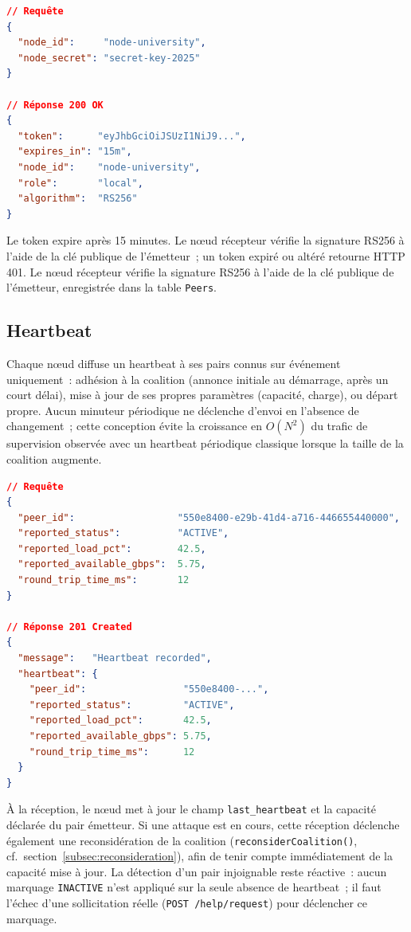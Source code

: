 \begin{lstlisting}[language=json, caption={Requête et réponse — \texttt{POST /auth/token}.}, label=lst:auth]
// Requête
{
  "node_id":     "node-university",
  "node_secret": "secret-key-2025"
}

// Réponse 200 OK
{
  "token":      "eyJhbGciOiJSUzI1NiJ9...",
  "expires_in": "15m",
  "node_id":    "node-university",
  "role":       "local",
  "algorithm":  "RS256"
}
\end{lstlisting}

Le token expire après 15 minutes. Le nœud récepteur vérifie la signature RS256 à l'aide de la clé publique de l'émetteur~; un token expiré ou altéré retourne HTTP 401. Le nœud récepteur vérifie la signature RS256 à l'aide de la clé publique de l'émetteur, enregistrée dans la table \texttt{Peers}.

\subsection{Heartbeat}

Chaque nœud diffuse un heartbeat à ses pairs connus sur événement uniquement~: adhésion à la coalition (annonce initiale au démarrage, après un court délai), mise à jour de ses propres paramètres (capacité, charge), ou départ propre. Aucun minuteur périodique ne déclenche d'envoi en l'absence de changement~; cette conception évite la croissance en $O(N^2)$ du trafic de supervision observée avec un heartbeat périodique classique lorsque la taille de la coalition augmente.

\begin{lstlisting}[language=json, caption={Requête et réponse — \texttt{POST /heartbeat}.}, label=lst:heartbeat]
// Requête
{
  "peer_id":                  "550e8400-e29b-41d4-a716-446655440000",
  "reported_status":          "ACTIVE",
  "reported_load_pct":        42.5,
  "reported_available_gbps":  5.75,
  "round_trip_time_ms":       12
}

// Réponse 201 Created
{
  "message":   "Heartbeat recorded",
  "heartbeat": {
    "peer_id":                 "550e8400-...",
    "reported_status":         "ACTIVE",
    "reported_load_pct":       42.5,
    "reported_available_gbps": 5.75,
    "round_trip_time_ms":      12
  }
}
\end{lstlisting}

À la réception, le nœud met à jour le champ \texttt{last\_heartbeat} et la capacité déclarée du pair émetteur. Si une attaque est en cours, cette réception déclenche également une reconsidération de la coalition (\texttt{reconsiderCoalition()}, cf.~section~\ref{subsec:reconsideration}), afin de tenir compte immédiatement de la capacité mise à jour. La détection d'un pair injoignable reste réactive~: aucun marquage \texttt{INACTIVE} n'est appliqué sur la seule absence de heartbeat~; il faut l'échec d'une sollicitation réelle (\texttt{POST /help/request}) pour déclencher ce marquage.

